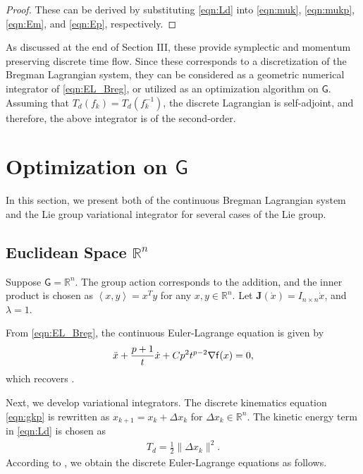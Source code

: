 \documentclass[letterpaper, 10pt, conference]{ieeeconf}
\newcommand{\G}{\ensuremath{\mathsf{G}}}
\renewcommand{\Re}{\ensuremath{\mathbb{R}}}
\newcommand{\pair}[1]{\ensuremath{\left\langle #1 \right\rangle}}
\begin{document}
\begin{proof}
    These can be derived by substituting \eqref{eqn:Ld} into \eqref{eqn:muk}, \eqref{eqn:mukp}, \eqref{eqn:Em}, and \eqref{eqn:Ep}, respectively. 
\end{proof}
As discussed at the end of Section III, these provide symplectic and momentum preserving discrete time flow.
Since these corresponds to a discretization of the Bregman Lagrangian system, they can be considered as a geometric numerical integrator of \eqref{eqn:EL_Breg}, or utilized as an optimization algorithm on $\G$.
Assuming that $T_d(f_k)=T_d(f_k^{-1})$, the discrete Lagrangian is self-adjoint, and therefore, the above integrator is of the second-order.

\section{Optimization on $\G$}

In this section, we present both of the continuous Bregman Lagrangian system and the Lie group variational integrator for several cases of the Lie group.

\subsection{Euclidean Space $\Re^n$}

Suppose $\G=\Re^n$. 
The group action corresponds to the addition, and the inner product is chosen as $\pair{x,y}=x^Ty$ for any $x,y\in\Re^n$.
Let $\mathbf{J}(\dot x) = I_{n\times n} \dot x$, and $\lambda =1$. 

From \eqref{eqn:EL_Breg}, the continuous Euler-Lagrange equation is given by
\begin{align}
    \ddot x + \frac{p+1}{t} \dot x + Cp^2 t^{p-2} \nabla \mathsf{f}(x) = 0,\label{eqn:EL_Re}
\end{align}
which recovers \cite{wibisono2016variational}.

Next, we develop variational integrators. 
The discrete kinematics equation \eqref{eqn:gkp} is rewritten as $x_{k+1} = x_k + \Delta x_k$ for $\Delta x_k\in\Re^n$.
The kinetic energy term in \eqref{eqn:Ld} is chosen as
\begin{align*}
    T_d =\frac{1}{2}\|\Delta x_k\|^2.
\end{align*}
According to , we obtain the discrete Euler-Lagrange equations as follows.
\end{document}
